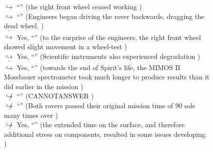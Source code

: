 \documentclass[11pt,a4paper, onecolumn]{article}
\begin{document}
\begin{figure}[t] \small \begin{tcolorbox}[boxsep=0pt,left=5pt,right=0pt,top=2pt,colback = yellow!5] \begin{dialogue}
 \small 
\colorbox{pink!25}{$\hookrightarrow$}
{ ``'' (the right front wheel ceased working ) }
\\
\colorbox{pink!25}{$\hookrightarrow$}
{ ``'' (Engineers began driving the rover backwards, dragging the dead wheel. ) }
\\
\colorbox{pink!25}{ $\bar{\hookrightarrow}$}
\colorbox{red!25}{Yes,}
{ ``'' (to the surprise of the engineers, the right front wheel showed slight movement in a wheel-test ) }
\\
\colorbox{pink!25}{$\hookrightarrow$}
\colorbox{red!25}{Yes,}
{ ``'' (Scientific instruments also experienced degradation ) }
\\
\colorbox{pink!25}{ $\bar{\hookrightarrow}$}
\colorbox{red!25}{Yes,}
{ ``'' (towards the end of Spirit's life, the MIMOS II Mossbauer spectrometer took much longer to produce results than it did earlier in the mission ) }
\\
\colorbox{pink!25}{$\not\hookrightarrow$}
{ ``'' (CANNOTANSWER ) }
\\
\colorbox{pink!25}{$\not\hookrightarrow$}
{ ``'' (Both rovers passed their original mission time of 90 sols many times over ) }
\\
\colorbox{pink!25}{$\not\hookrightarrow$}
\colorbox{red!25}{Yes,}
{ ``'' (the extended time on the surface, and therefore additional stress on components, resulted in some issues developing. ) }
\\
 \end{dialogue}\end{tcolorbox}\end{figure}
\end{document}
